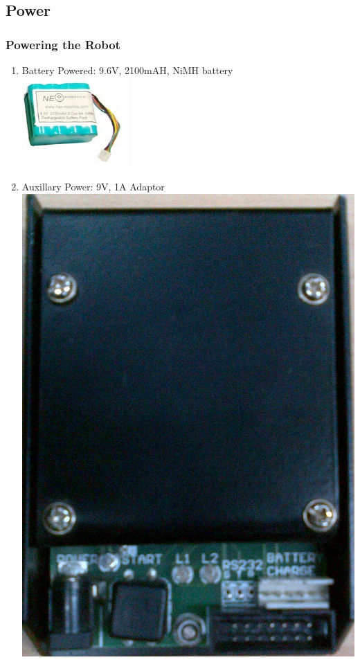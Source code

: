 \documentclass[10pt,red]{beamer}
\begin{document}

\subsection{Power}
\begin{frame}
	\frametitle{Powering the Robot} \pause
		\begin{enumerate}
			\item<1->	Battery Powered:	9.6V, 2100mAH, NiMH battery \\[8pt] 
			\includegraphics[width=0.15\linewidth]{battery} \\[10pt]
			\item<2->	Auxillary Power:  9V, 1A Adaptor \\[8pt]
			\includegraphics[width=0.15\linewidth]{auxillary} \\[10pt]  
		\end{enumerate}
\end{frame}


\end{document}
